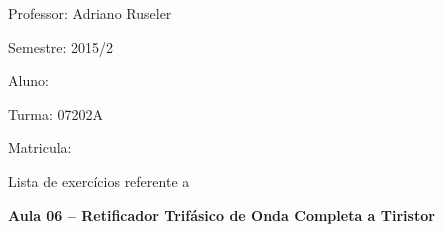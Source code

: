 \documentclass[11pt,paper=a4,answers]{exam}
\begin{document}
\par
\bigskip\bigskip
\begin{minipage}[t]{.6\textwidth}%
	Professor: Adriano Ruseler \par
	Semestre: 2015/2 \par
	Aluno: \makebox[2.5in]{\hrulefill} \par
	
\end{minipage}%
\hfill
\begin{minipage}[t]{.4\textwidth}%
	Turma:  07202A \par
     \par
	Matricula: \makebox[1.5in]{\hrulefill} \par
\end{minipage}
\par
\bigskip




\begin{framed}
	\centering Lista de exercícios referente a\\ \raggedright
	 \textbf{Aula 06 -- Retificador Trifásico de Onda Completa a Tiristor }
\end{framed}
\end{document}

